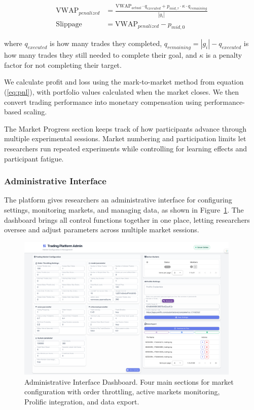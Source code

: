 \begin{align}
\text{VWAP}_{penalized} &= \frac{\text{VWAP}_{actual} \cdot q_{executed} + p_{mid,\tau} \cdot \kappa \cdot q_{remaining}}{|g_i|} \label{eq:vwap_penalized}\\
\text{Slippage} &= \text{VWAP}_{penalized} - p_{mid,0} \label{eq:slippage}
\end{align}

where $q_{executed}$ is how many trades they completed, $q_{remaining} = |g_i| - q_{executed}$ is how many trades they still needed to complete their goal, and $\kappa$ is a penalty factor for not completing their target.

We calculate profit and loss using the mark-to-market method from equation (\ref{eq:pnl}), with portfolio values calculated when the market closes. We then convert trading performance into monetary compensation using performance-based scaling.

The Market Progress section keeps track of how participants advance through multiple experimental sessions. Market numbering and participation limits let researchers run repeated experiments while controlling for learning effects and participant fatigue.

\subsubsection{Administrative Interface}

The platform gives researchers an administrative interface for configuring settings, monitoring markets, and managing data, as shown in Figure~\ref{fig:admin}. The dashboard brings all control functions together in one place, letting researchers oversee and adjust parameters across multiple market sessions.

\begin{figure}[!htbp]
\centering
\includegraphics[width=0.95\textwidth]{figs/admin-page.png}
\caption{Administrative Interface Dashboard. Four main sections for market configuration with order throttling, active markets monitoring, Prolific integration, and data export.}
\label{fig:admin}
\end{figure}

